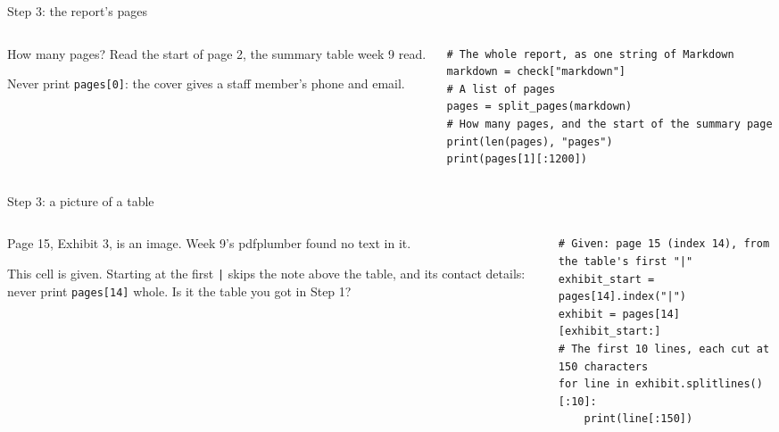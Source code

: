 \documentclass[9pt,aspectratio=169]{beamer}
\begin{document}
\begin{frame}[fragile]{Step 3: the report's pages}
    \begin{columns}[T]
        \begin{column}{0.37\textwidth}
            How many pages? Read the start of page 2, the summary table week 9 read.

            \medskip
            Never print \texttt{pages[0]}: the cover gives a staff member's phone and email.
        \end{column}
        \begin{column}{0.6\textwidth}
\begin{lstlisting}
# The whole report, as one string of Markdown
markdown = check["markdown"]
# A list of pages
pages = split_pages(markdown)
# How many pages, and the start of the summary page
print(len(pages), "pages")
print(pages[1][:1200])
\end{lstlisting}
        \end{column}
    \end{columns}
\end{frame}

\begin{frame}[fragile]{Step 3: a picture of a table}
    \begin{columns}[T]
        \begin{column}{0.37\textwidth}
            Page 15, Exhibit 3, is an image. Week 9's pdfplumber found no text in it.

            \medskip
            This cell is given. Starting at the first \texttt{|} skips the note above the table, and its contact details: never print \texttt{pages[14]} whole. Is it the table you got in Step 1?
        \end{column}
        \begin{column}{0.6\textwidth}
\begin{lstlisting}
# Given: page 15 (index 14), from the table's first "|"
exhibit_start = pages[14].index("|")
exhibit = pages[14][exhibit_start:]
# The first 10 lines, each cut at 150 characters
for line in exhibit.splitlines()[:10]:
    print(line[:150])
\end{lstlisting}
        \end{column}
    \end{columns}
\end{frame}
\end{document}
